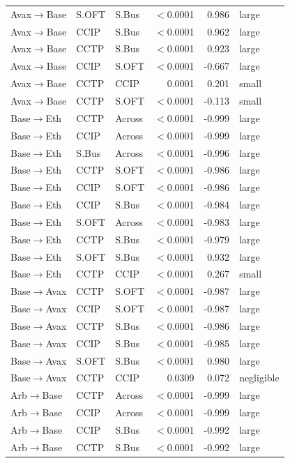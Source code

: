 \begin{table}[ht]
\begin{tabular}{lllrrl}
\midrule
Avax$\to$Base & S.OFT & S.Bus & $<$0.0001 & 0.986 & large \\
Avax$\to$Base & CCIP & S.Bus & $<$0.0001 & 0.962 & large \\
Avax$\to$Base & CCTP & S.Bus & $<$0.0001 & 0.923 & large \\
Avax$\to$Base & CCIP & S.OFT & $<$0.0001 & -0.667 & large \\
Avax$\to$Base & CCTP & CCIP & 0.0001 & 0.201 & small \\
Avax$\to$Base & CCTP & S.OFT & $<$0.0001 & -0.113 & small \\
\midrule
Base$\to$Eth & CCTP & Across & $<$0.0001 & -0.999 & large \\
Base$\to$Eth & CCIP & Across & $<$0.0001 & -0.999 & large \\
Base$\to$Eth & S.Bus & Across & $<$0.0001 & -0.996 & large \\
Base$\to$Eth & CCTP & S.OFT & $<$0.0001 & -0.986 & large \\
Base$\to$Eth & CCIP & S.OFT & $<$0.0001 & -0.986 & large \\
Base$\to$Eth & CCIP & S.Bus & $<$0.0001 & -0.984 & large \\
Base$\to$Eth & S.OFT & Across & $<$0.0001 & -0.983 & large \\
Base$\to$Eth & CCTP & S.Bus & $<$0.0001 & -0.979 & large \\
Base$\to$Eth & S.OFT & S.Bus & $<$0.0001 & 0.932 & large \\
Base$\to$Eth & CCTP & CCIP & $<$0.0001 & 0.267 & small \\
\midrule
Base$\to$Avax & CCTP & S.OFT & $<$0.0001 & -0.987 & large \\
Base$\to$Avax & CCIP & S.OFT & $<$0.0001 & -0.987 & large \\
Base$\to$Avax & CCTP & S.Bus & $<$0.0001 & -0.986 & large \\
Base$\to$Avax & CCIP & S.Bus & $<$0.0001 & -0.985 & large \\
Base$\to$Avax & S.OFT & S.Bus & $<$0.0001 & 0.980 & large \\
Base$\to$Avax & CCTP & CCIP & 0.0309 & 0.072 & negligible \\
\midrule
Arb$\to$Base & CCTP & Across & $<$0.0001 & -0.999 & large \\
Arb$\to$Base & CCIP & Across & $<$0.0001 & -0.999 & large \\
Arb$\to$Base & CCIP & S.Bus & $<$0.0001 & -0.992 & large \\
Arb$\to$Base & CCTP & S.Bus & $<$0.0001 & -0.992 & large \\

\end{tabular}
\end{table}
